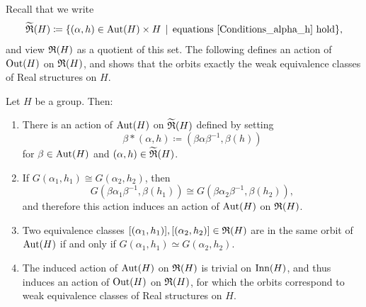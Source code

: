 Recall that we write 
\[
\widetilde{{\mathfrak R}}(H) \coloneqq \{ (\alpha,h)\in \operatorname{Aut}(H)\times H \,\mid\, \mbox{equations }\eqref{Conditions_alpha_h}\mbox{ hold}\},
\]
and view ${\mathfrak R}(H)$ as a quotient of this set. The following defines an action of $\operatorname{Out}(H)$ on ${\mathfrak R}(H)$, and shows that the orbits exactly the weak equivalence classes of Real structures on $H$.

\begin{prop}
  Let $H$ be a group. Then:
  \begin{enumerate}
    \item There is an action of $\operatorname{Aut}(H)$ on $\widetilde{{\mathfrak R}}(H)$ defined by setting
    \[
    \beta * (\alpha, h) \coloneqq (\beta  \alpha  \beta^{-1}, \beta(h))
    \]
    for $\beta \in \operatorname{Aut}(H)$ and $(\alpha, h) \in \widetilde{{\mathfrak R}}(H)$. 

  \item If $G(\alpha_1, h_1) \cong G(\alpha_2, h_2)$, then
  \[
  G(\beta  \alpha_1  \beta^{-1} , \beta(h_1)) \cong G(\beta  \alpha_2  \beta^{-1}, \beta(h_2)),
  \]
  and therefore this action induces an action of $\operatorname{Aut}(H)$ on ${\mathfrak R}(H)$.
  
  \item Two equivalence classes $[(\alpha_1,h_1)], [(\alpha_2, h_2)] \in {\mathfrak R}(H)$ are in the same orbit of $\operatorname{Aut}(H)$ if and only if $G(\alpha_1, h_1) \simeq G(\alpha_2, h_2)$.
  
  \item The induced action of $\operatorname{Aut}(H)$ on ${\mathfrak R}(H)$ is trivial on $\operatorname{Inn}(H)$, and thus induces an action of $\operatorname{Out}(H)$ on ${\mathfrak R}(H)$, for which the orbits correspond to weak equivalence classes of Real structures on $H$.
  \end{enumerate}
\end{prop}

